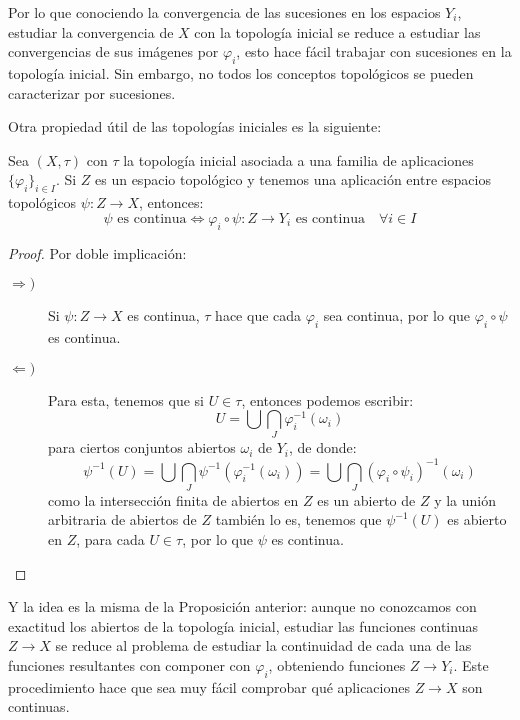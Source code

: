 \noindent
Por lo que conociendo la convergencia de las sucesiones en los espacios $Y_i$, estudiar la convergencia de $X$ con la topología inicial se reduce a estudiar las convergencias de sus imágenes por $\varphi_i$, esto hace fácil trabajar con sucesiones en la topología inicial. Sin embargo, no todos los conceptos topológicos se pueden caracterizar por sucesiones.

Otra propiedad útil de las topologías iniciales es la siguiente:

\begin{prop}
    Sea $(X,\tau)$ con $\tau$ la topología inicial asociada a una familia de aplicaciones $\{\varphi_i\}_{i \in I}$. Si $Z$ es un espacio topológico y tenemos una aplicación entre espacios topológicos $\psi:Z\to X$, entonces:
    \begin{equation*}
        \psi \text{\ es continua} \Longleftrightarrow \varphi_i\circ \psi:Z\to Y_i \text{\ es continua}\quad \forall i \in I
    \end{equation*}
    \begin{proof}
        Por doble implicación:
        \begin{description}
            \item [$\Longrightarrow )$] Si $\psi:Z\to X$ es continua, $\tau$ hace que cada $\varphi_i$ sea continua, por lo que $\varphi_i\circ\psi$ es continua.
            \item [$\Longleftarrow )$] Para esta, tenemos que si $U\in \tau$, entonces podemos escribir:
                \begin{equation*}
                    U = \bigcup \bigcap_{J} \varphi_i^{-1}(\omega_i)
                \end{equation*}
                para ciertos conjuntos abiertos $\omega_i$ de $Y_i$, de donde:
                \begin{equation*}
                    \psi^{-1}(U) = \bigcup\bigcap_{J}\psi^{-1}(\varphi^{-1}_i(\omega_i)) = \bigcup\bigcap_J {(\varphi_i \circ \psi_i)}^{-1}(\omega_i)
                \end{equation*}
                como la intersección finita de abiertos en $Z$ es un abierto de $Z$ y la unión arbitraria de abiertos de $Z$ también lo es, tenemos que $\psi^{-1}(U)$ es abierto en $Z$, para cada $U\in \tau$, por lo que $\psi$ es continua.
        \end{description}
    \end{proof}
\end{prop}

\noindent
Y la idea es la misma de la Proposición anterior: aunque no conozcamos con exactitud los abiertos de la topología inicial, estudiar las funciones continuas $Z\to X$ se reduce al problema de estudiar la continuidad de cada una de las funciones resultantes con componer con $\varphi_i$, obteniendo funciones $Z\to Y_i$. Este procedimiento hace que sea muy fácil comprobar qué aplicaciones $Z\to X$ son continuas.

